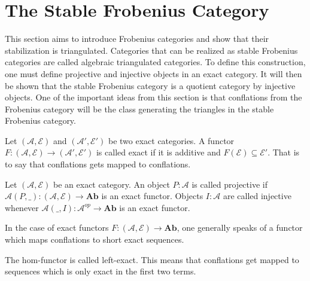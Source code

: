 \section{The Stable Frobenius Category}

    This section aims to introduce Frobenius categories and show that their stabilization is triangulated. Categories that can be realized as stable Frobenius categories are called algebraic triangulated categories. To define this construction, one must define projective and injective objects in an exact category. It will then be shown that the stable Frobenius category is a quotient category by injective objects. One of the important ideas from this section is that conflations from the Frobenius category will be the class generating the triangles in the stable Frobenius category.

    \begin{definition}
        Let $(\mathcal{A},\mathcal{E})$ and $(\mathcal{A}',\mathcal{E}')$ be two exact categories. A functor $F:(\mathcal{A},\mathcal{E})\rightarrow (\mathcal{A}',\mathcal{E}')$ is called exact if it is additive and $F(\mathcal{E})\subseteq \mathcal{E}'$. That is to say that conflations gets mapped to conflations. %
    \end{definition}

    \begin{definition}
        Let $(\mathcal{A},\mathcal{E})$ be an exact category. An object $P:\mathcal{A}$ is called projective if $\mathcal{A}(P,\_):(\mathcal{A},\mathcal{E})\rightarrow \textbf{Ab}$ is an exact functor. Objects $I:\mathcal{A}$ are called injective whenever $\mathcal{A}(\_,I):\mathcal{A}^{op}\rightarrow\textbf{Ab}$ is an exact functor.
    \end{definition}

    \begin{remark}
        In the case of exact functors $F:(\mathcal{A},\mathcal{E})\rightarrow\textbf{Ab}$, one generally speaks of a functor which maps conflations to short exact sequences.
    \end{remark}

    \begin{remark}
        The hom-functor is called left-exact. This means that conflations get mapped to sequences which is only exact in the first two terms.
    \end{remark}

